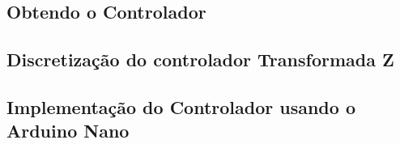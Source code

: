 \subsection{Obtendo o Controlador}




\subsection{Discretização do controlador Transformada Z}



\subsection{Implementação do Controlador usando o Arduino Nano}